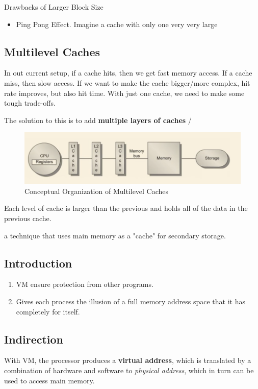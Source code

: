 \documentclass[12pt]{article}
\begin{document}
Drawbacks of Larger Block Size
\begin{itemize}
    \item Ping Pong Effect. Imagine a cache with only one very very large
\end{itemize}

\subsection*{Multilevel Caches}
In out current setup, if a cache hits, then we get fast memory access. If a cache miss, then slow access.
If we want to make the cache bigger/more complex, hit rate improves, but also hit time. With just one cache, we need to make some tough trade-offs.

The solution to this is to add \textbf{multiple layers of caches}
/\begin{figure}[h]
    \centering
    \includegraphics[scale=1.0]{images/multilevelcaches.png}
    \caption{Conceptual Organization of Multilevel Caches}
\end{figure}

Each level of cache is larger than the previous and holds all of the data in the previous cache.

\begin{definition}
    a technique that uses main memory as a "cache" for secondary storage.
\end{definition}

\subsection*{Introduction}
\begin{enumerate}
    \item VM ensure protection from other programs.
    \item Gives each process the illusion of a full memory address space that it has completely for itself.
\end{enumerate}

\subsection*{Indirection}
With VM, the processor produces a \textbf{virtual address}, which is translated by a combination of hardware and software to \emph{physical address}, which in turn can be used to access main memory.
\end{document}
